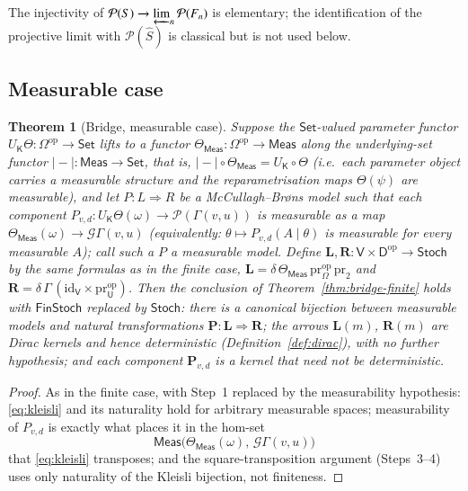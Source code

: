 \documentclass[11pt,a4paper]{article}
\theoremstyle{plain}
\newtheorem{theorem}{Theorem}[section]
\theoremstyle{definition}
\theoremstyle{remark}
\newcommand{\cat}[1]{\mathsf{#1}}
\newcommand{\catU}{\cat{U}}
\newcommand{\catV}{\cat{V}}
\newcommand{\catO}{\cat{\Omega}}
\newcommand{\catD}{\cat{D}}
\newcommand{\catK}{\cat{K}}
\newcommand{\Meas}{\cat{Meas}}
\newcommand{\Set}{\cat{Set}}
\newcommand{\Stoch}{\cat{Stoch}}
\newcommand{\FinStoch}{\cat{FinStoch}}
\newcommand{\G}{\mathcal{G}}
\newcommand{\Prb}{\mathcal{P}}
\newcommand{\op}{\mathrm{op}}
\newcommand{\id}{\mathrm{id}}
\newcommand{\pr}{\mathrm{pr}}
\newcommand{\del}{\delta}
\begin{document}
The injectivity of $\Prb(S) \to \varprojlim_n \Prb(F_n)$ is elementary; the
identification of the projective limit with $\Prb(\hat S)$ is classical but
is not used below. 

\subsection{Measurable case}

\begin{theorem}[Bridge, measurable case]\label{thm:bridge-meas}
Suppose the $\Set$-valued parameter functor
$U_\catK\Theta \colon \catO^{\op} \to \Set$ lifts to a functor
$\Theta_\Meas \colon \catO^{\op} \to \Meas$ along the underlying-set functor
$|\!-\!| \colon \Meas \to \Set$, that is,
$|\!-\!| \circ \Theta_\Meas = U_\catK \circ \Theta$ (i.e.\ each parameter
object carries a measurable structure and the reparametrisation maps
$\Theta(\psi)$ are measurable), and let
$P \colon L \Rightarrow R$ be a McCullagh--Br\o ns model such that each
component $P_{v,d} \colon U_\catK\Theta(\omega) \to \Prb(\Gamma(v,u))$ is
measurable as a map $\Theta_\Meas(\omega) \to \G \Gamma(v,u)$ (equivalently:
$\theta \mapsto P_{v,d}(A \mid \theta)$ is measurable for every measurable
$A$); call such a $P$ a \emph{measurable model}. Define
$\mathbf{L}, \mathbf{R} \colon \catV \times \catD^{\op} \to \Stoch$ by the
same formulas as in the finite case,
$\mathbf{L} = \del\,\Theta_\Meas\,\pr_\catO^{\op}\,\pr_2$ and
$\mathbf{R} = \del\,\Gamma\,(\id_\catV \times \pr_\catU^{\op})$. Then the
conclusion of Theorem~\ref{thm:bridge-finite} holds with $\FinStoch$ replaced
by $\Stoch$: there is a canonical bijection between measurable models and
natural transformations $\mathbf{P} \colon \mathbf{L} \Rightarrow \mathbf{R}$;
the arrows $\mathbf{L}(m)$, $\mathbf{R}(m)$ are Dirac kernels and hence
deterministic (Definition~\ref{def:dirac}), with no further hypothesis;
and each component $\mathbf{P}_{v,d}$ is a kernel that need not be
deterministic.
\end{theorem}

\begin{proof}
As in the finite case, with Step~1 replaced by the measurability hypothesis:
\eqref{eq:kleisli} and its naturality hold for arbitrary measurable spaces;
measurability of $P_{v,d}$ is exactly what places it in the hom-set
\[
\Meas\bigl(\Theta_\Meas(\omega),\,\G\Gamma(v,u)\bigr)
\]
that \eqref{eq:kleisli} transposes; and the square-transposition argument
(Steps~3--4) uses only naturality of the Kleisli bijection, not finiteness.
\end{proof}
\end{document}
